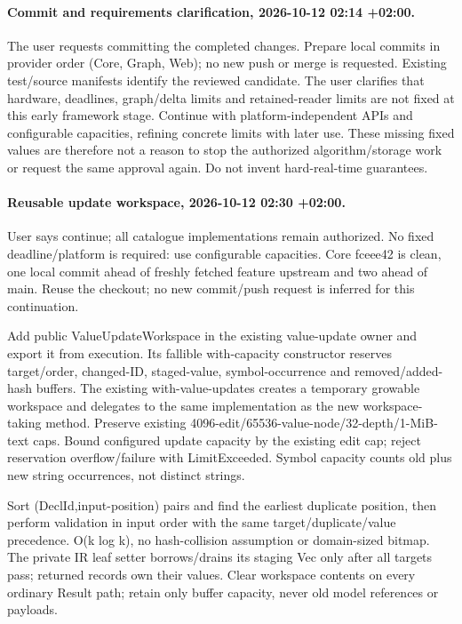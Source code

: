 \documentclass[11pt,a4paper]{article}
\begin{document}
\paragraph{Commit and requirements clarification, 2026-10-12 02:14 +02:00.}
The user requests committing the completed changes. Prepare local commits in
provider order (Core, Graph, Web); no new push or merge is requested. Existing
test/source manifests identify the reviewed candidate. The user clarifies that
hardware, deadlines, graph/delta limits and retained-reader limits are not fixed
at this early framework stage. Continue with platform-independent APIs and
configurable capacities, refining concrete limits with later use. These missing
fixed values are therefore not a reason to stop the authorized algorithm/storage
work or request the same approval again. Do not invent hard-real-time guarantees.

\paragraph{Reusable update workspace, 2026-10-12 02:30 +02:00.}
User says continue; all catalogue implementations remain authorized. No fixed
deadline/platform is required: use configurable capacities. Core fceee42 is clean,
one local commit ahead of freshly fetched feature upstream and two ahead of main.
Reuse the checkout; no new commit/push request is inferred for this continuation.

Add public ValueUpdateWorkspace in the existing value-update owner and export it
from execution. Its fallible with-capacity constructor reserves target/order,
changed-ID, staged-value, symbol-occurrence and removed/added-hash buffers. The
existing with-value-updates creates a temporary growable workspace and delegates
to the same implementation as the new workspace-taking method. Preserve existing
4096-edit/65536-value-node/32-depth/1-MiB-text caps. Bound configured update capacity
by the existing edit cap; reject reservation overflow/failure with LimitExceeded.
Symbol capacity counts old plus new string occurrences, not distinct strings.

Sort (DeclId,input-position) pairs and find the earliest duplicate position, then
perform validation in input order with the same target/duplicate/value precedence.
O(k log k), no hash-collision assumption or domain-sized bitmap. The private IR
leaf setter borrows/drains its staging Vec only after all targets pass; returned
records own their values. Clear workspace contents on every ordinary Result path;
retain only buffer capacity, never old model references or payloads.
\end{document}
